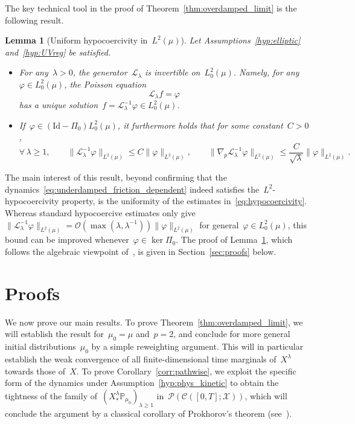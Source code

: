 \documentclass[10pt]{article}
\newcommand{\cL}{\mathcal{L}}
\renewcommand{\P}{\mathbb{P}}
\newcommand{\cX}{\mathcal{X}}
\newcommand{\wLmu}{L^2(\mu)}
\newcommand{\wLmuz}{L^2_0(\mu)}
\newcommand{\1}{\mathbbm 1}
\newcommand{\bigo}{\mathcal{O}}
\newtheorem{lemma}{Lemma}
\begin{document}
The key technical tool in the proof of Theorem~\ref{thm:overdamped_limit} is the following result.
\begin{lemma}[Uniform hypocoercivity in~$\wLmu$]
    \label{lemma:hypocoercivity}
    Let Assumptions~\ref{hyp:elliptic} and~\ref{hyp:UVreg} be satisfied.
    \begin{itemize}
    \item{For any~$\lambda>0$, the generator~$\cL_\lambda$ is invertible on~$L_0^2(\mu)$. Namely, for any~$\varphi\in\wLmuz$, the Poisson equation
    \begin{equation}
        \cL_\lambda f = \varphi
    \end{equation}
    has a unique solution~$f=\cL_\lambda^{-1}\varphi\in\wLmuz$.}
    \item{If~$\varphi\in (\mathrm{Id}-\Pi_0)L_0^2(\mu)$, it furthermore holds that for some constant~$C>0$,
    \begin{equation}
        \label{eq:hypocoercivity}
       \forall\,\lambda\geq 1,\qquad \|\cL_\lambda^{-1}\varphi\|_{L^2(\mu)}\leq C\|\varphi\|_{L^2(\mu)},\qquad \|\nabla_p \cL_\lambda^{-1}\varphi\|_{L^2(\mu)} \leq \frac{C}{\sqrt\lambda}\|\varphi\|_{L^2(\mu)}.
    \end{equation}
    }
    \end{itemize}
\end{lemma}
The main interest of this result, beyond confirming that the dynamics~\eqref{eq:underdamped_friction_dependent} indeed satisfies the~$L^2$-hypocoercivity property, is the uniformity of the estimates in~\eqref{eq:hypocoercivity}.
Whereas standard hypocoercive estimates only give~$\|\cL_\lambda^{-1}\varphi\|_{\wLmu} = \bigo(\max(\lambda,\lambda^{-1}))\|\varphi\|_{\wLmu}$ for general~$\varphi\in\wLmuz$, this bound can be improved whenever~$\varphi\in \ker\Pi_0$. 
The proof of Lemma~\ref{lemma:hypocoercivity}, which follows the algebraic viewpoint of~\cite{BFLS22}, is given in Section~\ref{sec:proofs} below.

\section{Proofs}
\label{sec:proof_main}
We now prove our main results. To prove Theorem~\ref{thm:overdamped_limit}, we will establish the result for~$\mu_0=\mu$ and~$p=2$, and conclude for more general initial distributions~$\mu_0$ by a simple reweighting argument. This will in particular establish the weak convergence of all finite-dimensional time marginals of~$X^\lambda$ towards those of~$X$.
To prove Corollary~\ref{corr:pathwise}, we exploit the specific form of the dynamics under Assumption~\eqref{hyp:phys_kinetic} to obtain the tightness of the family of~$\left(X^\lambda_*\P_{\mu_0}\right)_{\lambda\geq 1}$ in~$\mathcal P(\mathcal C([0,T];\cX))$, which will conclude the argument by a classical corollary of Prokhorov's theorem (see~\cite[Theorem 8.1]{B68}).
\end{document}

